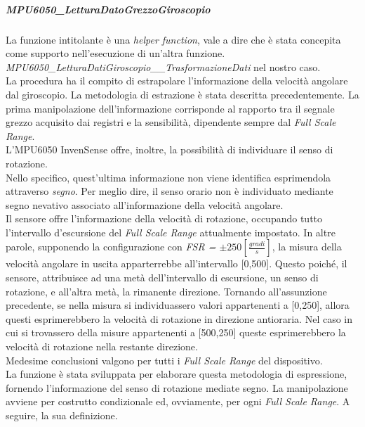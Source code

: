 \documentclass[11pt]{report}
\begin{document}
\subparagraph{MPU6050\_LetturaDatoGrezzoGiroscopio}
La funzione intitolante è una \textit{helper function}, vale a dire che è stata concepita come supporto nell'esecuzione di un'altra funzione.\\
\textit{MPU6050\_LetturaDatiGiroscopio\_\_TrasformazioneDati} nel nostro caso.\\
La procedura ha il compito di estrapolare l'informazione della velocità angolare dal giroscopio. La metodologia di estrazione è stata descritta precedentemente. 
La prima manipolazione dell'informazione corrisponde al rapporto tra il segnale grezzo acquisito dai registri e la sensibilità, dipendente sempre dal \textit{Full Scale Range}.\\
L'MPU6050 InvenSense offre, inoltre, la possibilità di individuare il senso di rotazione.\\
Nello specifico, quest'ultima informazione non viene identifica esprimendola attraverso \textit{segno}. Per meglio dire, il senso orario non è individuato mediante segno nevativo associato all'informazione della velocità angolare.\\
Il sensore offre l'informazione della velocità di rotazione, occupando tutto l'intervallo d'escursione del \textit{Full Scale Range} attualmente impostato. In altre parole, supponendo la configurazione con \textit{FSR = $\pm250[\frac{gradi}{s}]$}, la misura della velocità angolare in uscita apparterrebbe all'intervallo [0,500].
Questo poiché, il sensore, attribuisce ad una metà dell'intervallo di escursione, un senso di rotazione, e all'altra metà, la rimanente direzione. Tornando all'assunzione precedente, se nella misura si individuassero valori appartenenti a [0,250], allora questi esprimerebbero la velocità di rotazione in direzione antioraria. 
Nel caso in cui si trovassero della misure appartenenti a [500,250] queste esprimerebbero la velocità di rotazione nella restante direzione.\\
Medesime conclusioni valgono per tutti i \textit{Full Scale Range} del dispositivo.\\
La funzione è stata sviluppata per elaborare questa metodologia di espressione, fornendo l'informazione del senso di rotazione mediate segno. La manipolazione avviene per costrutto condizionale ed, ovviamente, per ogni \textit{Full Scale Range}.
A seguire, la sua definizione.

\end{document}
